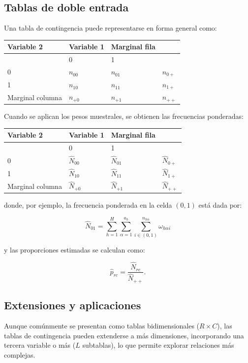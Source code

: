 \documentclass[
  spanish,
  12pt,
]{book}
\begin{document}
\subsection{Tablas de doble entrada}\label{tablas-de-doble-entrada}

Una tabla de contingencia puede representarse en forma general como:

\begin{longtable}[]{@{}llll@{}}
\toprule\noalign{}
Variable 2 & Variable 1 & Marginal fila & \\
\midrule\noalign{}
\endhead
\bottomrule\noalign{}
\endlastfoot
& 0 & 1 & \\
0 & \(n_{00}\) & \(n_{01}\) & \(n_{0+}\) \\
1 & \(n_{10}\) & \(n_{11}\) & \(n_{1+}\) \\
Marginal columna & \(n_{+0}\) & \(n_{+1}\) & \(n_{++}\) \\
\end{longtable}

Cuando se aplican los pesos muestrales, se obtienen las frecuencias ponderadas:

\begin{longtable}[]{@{}llll@{}}
\toprule\noalign{}
Variable 2 & Variable 1 & Marginal fila & \\
\midrule\noalign{}
\endhead
\bottomrule\noalign{}
\endlastfoot
& 0 & 1 & \\
0 & \(\hat{N}_{00}\) & \(\hat{N}_{01}\) & \(\hat{N}_{0+}\) \\
1 & \(\hat{N}_{10}\) & \(\hat{N}_{11}\) & \(\hat{N}_{1+}\) \\
Marginal columna & \(\hat{N}_{+0}\) & \(\hat{N}_{+1}\) & \(\hat{N}_{++}\) \\
\end{longtable}

donde, por ejemplo, la frecuencia ponderada en la celda \((0,1)\) está dada por:

\[
\hat{N}_{01} = \sum_{h=1}^{H} \sum_{\alpha=1}^{a_{h}} \sum_{i \in (0,1)}^{n_{h\alpha}} \omega_{h\alpha i}
\]

y las proporciones estimadas se calculan como:

\[
\hat{p}_{rc}=\frac{\hat{N}_{rc}}{\hat{N}_{++}}.
\]

\subsection{Extensiones y aplicaciones}\label{extensiones-y-aplicaciones}

Aunque comúnmente se presentan como tablas bidimensionales (\(R \times C\)), las tablas de contingencia pueden extenderse a más dimensiones, incorporando una tercera variable o más (\(L\) subtablas), lo que permite explorar relaciones más complejas.
\end{document}

